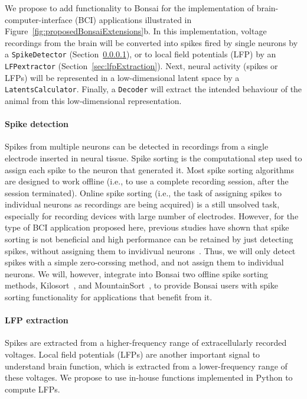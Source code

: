 We propose to add functionality to Bonsai for the implementation of
brain-computer-interface (BCI) applications illustrated in
Figure~\ref{fig:proposedBonsaiExtensions}b. In
this implementation, voltage recordings from the brain will be converted into
spikes fired by single neurons by a \texttt{SpikeDetector}
(Section~\ref{sec:spikeDetection}), or to local field potentials (LFP) by an
\texttt{LFPextractor} (Section~\ref{sec:lfpExtraction}). Next, neural activity
(spikes or LFPs) will be represented in a low-dimensional latent space by a
\texttt{LatentsCalculator}. Finally, a \texttt{Decoder} will extract the
intended behaviour of the animal from this low-dimensional representation.

\paragraph{Spike detection}
\label{sec:spikeDetection}

Spikes from multiple neurons can be detected in recordings from a single
electrode inserted in neural tissue. Spike sorting is the computational step
used to assign each spike to the neuron that generated it. Most spike sorting
algorithms are designed to work offline (i.e., to use a complete recording
session, after the session terminated). Online spike sorting (i.e., the task
of assigning spikes to individual neurons as recordings are being acquired) is a
still unsolved task, especially for recording devices with large number of
electrodes.
%
However, for the type of BCI application proposed here, previous studies have
shown that spike sorting is not beneficial and high performance can be retained
by just detecting spikes, without assigning them to invidivual
neurons~\citep{trautmannEtAl19,todorovaEtAl14}. Thus, we will only detect spikes with a simple zero-corssing method,
and not assign them to individual neurons.  We will, however, integrate into
Bonsai two offline spike sorting methods, Kilosort~\citep[][written in Matlab]{pachitariuEtAl16}, and MountainSort~\citep[][written in
Python]{chungEtAl17}, to provide Bonsai users with spike sorting functionality for
applications that benefit from it.

\paragraph{LFP extraction}
\label{sec:lfpExtractor}

Spikes are extracted from a higher-frequency range of extracellularly recorded
voltages. Local field potentials (LFPs) 
are another important signal to understand brain function, which is extracted
from a lower-frequency range of these voltages. We propose to use in-house
functions implemented in Python to compute LFPs.


